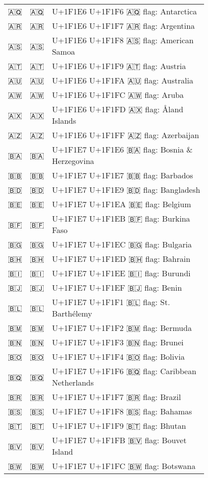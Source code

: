 \documentclass[a4paper,12pt]{article}
\newcommand{\fontA}[1]{{\fontspec[RawFeature={mode=harf,+dist,+ccmp}]{Segoe UI Emoji} #1}}
\newcommand{\fontB}[1]{{\fontspec[RawFeature={mode=harf,+dist,+ccmp}]{Noto Color Emoji} #1}}
\begin{document}
\begin{longtable}[c]{ccp{0.8\linewidth}}
\fontA{🇦🇶}&\fontB{🇦🇶}&U+1F1E6 U+1F1F6 🇦🇶 flag: Antarctica\\
\fontA{🇦🇷}&\fontB{🇦🇷}&U+1F1E6 U+1F1F7 🇦🇷 flag: Argentina\\
\fontA{🇦🇸}&\fontB{🇦🇸}&U+1F1E6 U+1F1F8 🇦🇸 flag: American Samoa\\
\fontA{🇦🇹}&\fontB{🇦🇹}&U+1F1E6 U+1F1F9 🇦🇹 flag: Austria\\
\fontA{🇦🇺}&\fontB{🇦🇺}&U+1F1E6 U+1F1FA 🇦🇺 flag: Australia\\
\fontA{🇦🇼}&\fontB{🇦🇼}&U+1F1E6 U+1F1FC 🇦🇼 flag: Aruba\\
\fontA{🇦🇽}&\fontB{🇦🇽}&U+1F1E6 U+1F1FD 🇦🇽 flag: Åland Islands\\
\fontA{🇦🇿}&\fontB{🇦🇿}&U+1F1E6 U+1F1FF 🇦🇿 flag: Azerbaijan\\
\fontA{🇧🇦}&\fontB{🇧🇦}&U+1F1E7 U+1F1E6 🇧🇦 flag: Bosnia \& Herzegovina\\
\fontA{🇧🇧}&\fontB{🇧🇧}&U+1F1E7 U+1F1E7 🇧🇧 flag: Barbados\\
\fontA{🇧🇩}&\fontB{🇧🇩}&U+1F1E7 U+1F1E9 🇧🇩 flag: Bangladesh\\
\fontA{🇧🇪}&\fontB{🇧🇪}&U+1F1E7 U+1F1EA 🇧🇪 flag: Belgium\\
\fontA{🇧🇫}&\fontB{🇧🇫}&U+1F1E7 U+1F1EB 🇧🇫 flag: Burkina Faso\\
\fontA{🇧🇬}&\fontB{🇧🇬}&U+1F1E7 U+1F1EC 🇧🇬 flag: Bulgaria\\
\fontA{🇧🇭}&\fontB{🇧🇭}&U+1F1E7 U+1F1ED 🇧🇭 flag: Bahrain\\
\fontA{🇧🇮}&\fontB{🇧🇮}&U+1F1E7 U+1F1EE 🇧🇮 flag: Burundi\\
\fontA{🇧🇯}&\fontB{🇧🇯}&U+1F1E7 U+1F1EF 🇧🇯 flag: Benin\\
\fontA{🇧🇱}&\fontB{🇧🇱}&U+1F1E7 U+1F1F1 🇧🇱 flag: St. Barthélemy\\
\fontA{🇧🇲}&\fontB{🇧🇲}&U+1F1E7 U+1F1F2 🇧🇲 flag: Bermuda\\
\fontA{🇧🇳}&\fontB{🇧🇳}&U+1F1E7 U+1F1F3 🇧🇳 flag: Brunei\\
\fontA{🇧🇴}&\fontB{🇧🇴}&U+1F1E7 U+1F1F4 🇧🇴 flag: Bolivia\\
\fontA{🇧🇶}&\fontB{🇧🇶}&U+1F1E7 U+1F1F6 🇧🇶 flag: Caribbean Netherlands\\
\fontA{🇧🇷}&\fontB{🇧🇷}&U+1F1E7 U+1F1F7 🇧🇷 flag: Brazil\\
\fontA{🇧🇸}&\fontB{🇧🇸}&U+1F1E7 U+1F1F8 🇧🇸 flag: Bahamas\\
\fontA{🇧🇹}&\fontB{🇧🇹}&U+1F1E7 U+1F1F9 🇧🇹 flag: Bhutan\\
\fontA{🇧🇻}&\fontB{🇧🇻}&U+1F1E7 U+1F1FB 🇧🇻 flag: Bouvet Island\\
\fontA{🇧🇼}&\fontB{🇧🇼}&U+1F1E7 U+1F1FC 🇧🇼 flag: Botswana\\

\end{longtable}
\end{document}
